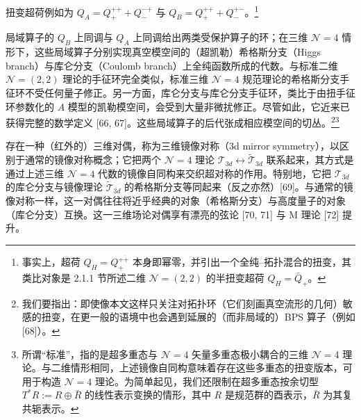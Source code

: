 

扭变超荷例如为 $Q_A = Q_+^{+\dot{+}} + Q_-^{-\dot{+}}$ 与 $Q_B = Q_+^{+\dot{+}} + Q_-^{+\dot{-}}$。\footnote{事实上，超荷 $Q_H = Q_+^{+\dot{+}}$ 本身即幂零，并引出一个全纯--拓扑混合的扭变，其类比对象是 2.1.1 节所述二维 $\mathcal{N}=(2,2)$ 的半扭变超荷 $Q_H = \bar Q_+$。}

局域算子的 $Q_B$ 上同调与 $Q_A$ 上同调给出两类受保护算子的环；在三维 $\mathcal{N}=4$ 情形下，这些局域算子分别实现真空模空间的（超凯勒）希格斯分支（Higgs branch）与库仑分支（Coulomb branch）上全纯函数所成的代数。与标准二维 $\mathcal{N}=(2,2)$ 理论的手征环完全类似，标准三维 $\mathcal{N}=4$ 规范理论的希格斯分支手征环不受任何量子修正。另一方面，库仑分支与库仑分支手征环，类比于由扭手征环参数化的 $A$ 模型的凯勒模空间，会受到大量非微扰修正。尽管如此，它近来已获得完整的数学定义 [66, 67]。这些局域算子的后代张成相应模空间的切丛。\footnote{我们要指出：即使像本文这样只关注对拓扑环（它们刻画真空流形的几何）敏感的扭变，在更一般的语境中也会遇到延展的（而非局域的）BPS 算子（例如 [68]）。}\footnote{所谓“标准”，指的是超多重态与 $\mathcal{N}=4$ 矢量多重态极小耦合的三维 $\mathcal{N}=4$ 理论。与二维情形相同，上述镜像自同构意味着存在这些多重态的扭变版本，可用于构造 $\mathcal{N}=4$ 理论。为简单起见，我们还限制在超多重态按余切型 $T^*R := R \oplus \bar R$ 的线性表示变换的情形，其中 $R$ 是规范群的酉表示，$\bar R$ 为其复共轭表示。}

存在一种（红外的）三维对偶，称为三维镜像对称（3d mirror symmetry），以区别于通常的镜像对称概念；它把两个 $\mathcal{N}=4$ 理论 $\mathcal{T}_{3d} \leftrightarrow \tilde{\mathcal{T}}_{3d}$ 联系起来，其方式是通过上述三维 $\mathcal{N}=4$ 代数的镜像自同构来交织超对称的作用。特别地，它把 $\mathcal{T}_{3d}$ 的库仑分支与镜像理论 $\tilde{\mathcal{T}}_{3d}$ 的希格斯分支等同起来（反之亦然）[69]。与通常的镜像对称一样，这一对偶往往将近乎经典的对象（希格斯分支）与高度量子的对象（库仑分支）互换。这一三维场论对偶享有漂亮的弦论 [70, 71] 与 M 理论 [72] 提升。

